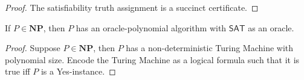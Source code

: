 \begin{proof}
    The satisfiability truth assignment is a succinct certificate.
\end{proof}
\begin{theorem}[Cook]\label{thm:cook}
    If $P\in \mathbf{NP}$, then $P$ has an oracle-polynomial algorithm with $\mathsf{SAT}$ as an oracle.
\end{theorem}
\begin{proof}
    Suppose $P \in \mathbf{NP}$, then $P$ has a non-deterministic Turing Machine with polynomial size.
    Encode the Turing Machine as a logical formula such that it is true iff $P$ is a Yes-instance.
\end{proof}